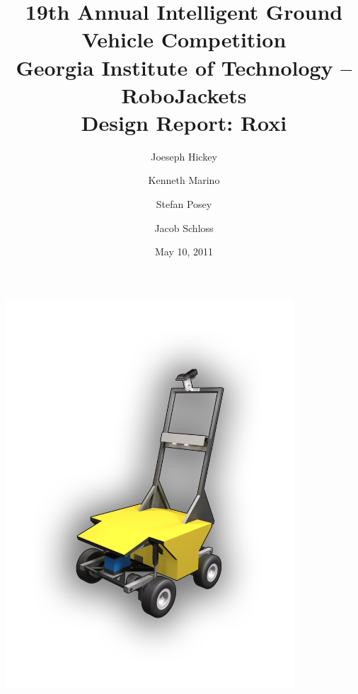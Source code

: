 \documentclass[letterpaper,12pt]{article}
\title{19th Annual Intelligent Ground Vehicle Competition\\\large{Georgia Institute of Technology -- RoboJackets}\\\large{Design Report: Roxi}}
\author{
Joeseph Hickey
\and
Kenneth Marino
\and
Stefan Posey
\and
Jacob Schloss
}
\date{May 10, 2011}
\begin{document}
\maketitle
\thispagestyle{empty}
\begin{center}
\includegraphics[width=4.25in]{./pics/RobotFrontCover.png}
\end{center}

\newpage


\newpage
\setcounter{tocdepth}{2}
\tableofcontents

\newpage
\listoffigures
\listoftables

\newpage


\newpage


\newpage


\newpage


\newpage


\newpage


%
\end{document}
